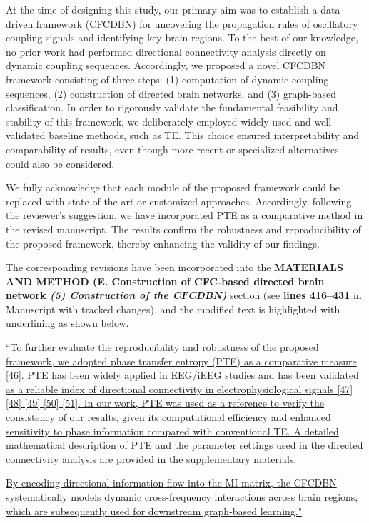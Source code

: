 \documentclass[12pt,technote,onecolumn]{IEEEtran}
\begin{document}
At the time of designing this study, our primary aim was to establish a data-driven framework (CFCDBN) for uncovering the propagation rules of oscillatory coupling signals and identifying key brain regions. To the best of our knowledge, no prior work had performed directional connectivity analysis directly on dynamic coupling sequences. Accordingly, we proposed a novel CFCDBN framework consisting of three steps: (1) computation of dynamic coupling sequences, (2) construction of directed brain networks, and (3) graph-based classification. In order to rigorously validate the fundamental feasibility and stability of this framework, we deliberately employed widely used and well-validated baseline methods, such as TE. This choice ensured interpretability and comparability of results, even though more recent or specialized alternatives could also be considered.

We fully acknowledge that each module of the proposed framework could be replaced with state-of-the-art or customized approaches. Accordingly, following the reviewer’s suggestion, we have incorporated PTE as a comparative method in the revised manuscript. The results confirm the robustness and reproducibility of the proposed framework, thereby enhancing the validity of our findings.


The corresponding revisions have been incorporated into the \textbf{MATERIALS AND METHOD (E. Construction of CFC-based directed brain network \textit{(5) Construction of the CFCDBN)}} section (see \textbf{lines 416–431} in Manuscript with tracked changes), and the modified text is highlighted with underlining as shown below.

\uline{``To further evaluate the reproducibility and robustness of the proposed framework, we adopted phase transfer entropy (PTE) as a comparative measure [46]. PTE has been widely applied in EEG/iEEG studies and has been validated as a reliable index of directional connectivity in electrophysiological signals [47] [48] [49] [50] [51]. In our work, PTE was used as a reference to verify the consistency of our results, given its computational efficiency and enhanced sensitivity to phase information compared with conventional TE. A detailed mathematical description of PTE and the parameter settings used in the directed connectivity analysis are provided in the supplementary materials.}

\uline{By encoding directional information flow into the MI matrix, the CFCDBN systematically models dynamic cross-frequency interactions across brain regions, which are subsequently used for downstream graph-based learning."}
\end{document}
